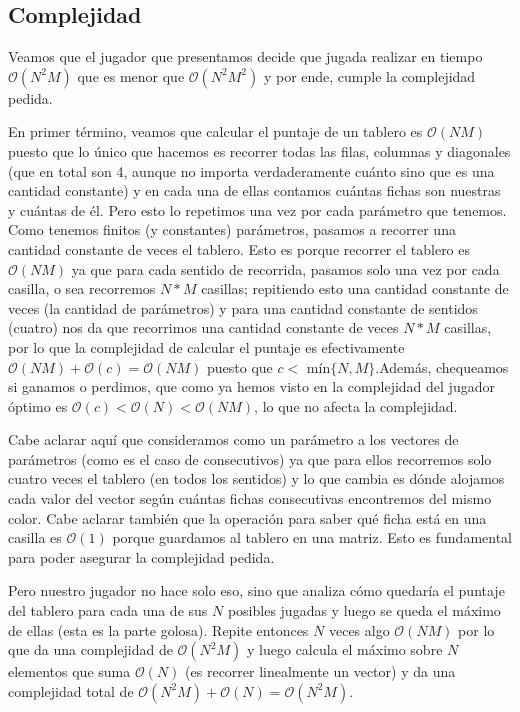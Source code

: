 \documentclass[A4paper,oneside,fleqn,11pt]{article}
\theoremstyle{definition}
\begin{document}
\subsection{Complejidad}

Veamos que el jugador que presentamos decide que jugada realizar en tiempo $\mathcal{O}(N^2 M)$ que es menor que $\mathcal{O}(N^2 M^2)$ y por ende, cumple la complejidad pedida. 





En primer término, veamos que calcular el puntaje de un tablero es $\mathcal{O}(NM)$ puesto que lo único que hacemos es recorrer todas las filas, columnas y diagonales (que en total son 4, aunque no importa verdaderamente cuánto sino que es una cantidad constante) y en cada una de ellas contamos cuántas fichas son nuestras y cuántas de él. Pero esto lo repetimos una vez por cada parámetro que tenemos. Como tenemos finitos (y constantes) parámetros, pasamos a recorrer una cantidad constante de veces el tablero. Esto es porque recorrer el tablero es $\mathcal{O}(NM)$ ya que para cada sentido de recorrida, pasamos solo una vez por cada casilla, o sea recorremos $N*M$ casillas; repitiendo esto una cantidad constante de veces (la cantidad de parámetros) y para una cantidad constante de sentidos (cuatro) nos da que recorrimos una cantidad constante de veces $N*M $ casillas, por lo que la complejidad de calcular el puntaje es efectivamente $\mathcal{O}(NM)+\mathcal{O}(c)=\mathcal{O}(NM)$ puesto que $c<$ mín$\{N,M\}$.Además, chequeamos si ganamos o perdimos, que como ya hemos visto en la complejidad del jugador óptimo es $\mathcal{O}(c)<\mathcal{O}(N)<\mathcal{O}(NM)$, lo que no afecta la complejidad.

Cabe aclarar aquí que consideramos como un parámetro a los vectores de parámetros (como es el caso de consecutivos) ya que para ellos recorremos solo cuatro veces el tablero (en todos los sentidos) y lo que cambia es dónde alojamos cada valor del vector según cuántas fichas consecutivas encontremos del mismo color. Cabe aclarar también que la operación para saber qué ficha está en una casilla es $\mathcal{O}(1)$ porque guardamos al tablero en una matriz. Esto es fundamental para poder asegurar la complejidad pedida.

 
Pero nuestro jugador no hace solo eso, sino que analiza cómo quedaría el puntaje del tablero para cada una de sus $N$ posibles jugadas y luego se queda el máximo de ellas (esta es la parte golosa). Repite entonces $N$ veces algo  $\mathcal{O}(N M)$ por lo que da una complejidad de $\mathcal{O}(N^2 M)$ y luego calcula el máximo sobre $N$ elementos que suma $\mathcal{O}(N)$ (es recorrer linealmente un vector) y da una complejidad total de $\mathcal{O}(N^2 M) +\mathcal{O}(N) = \mathcal{O}(N^2 M)$.
\end{document}
